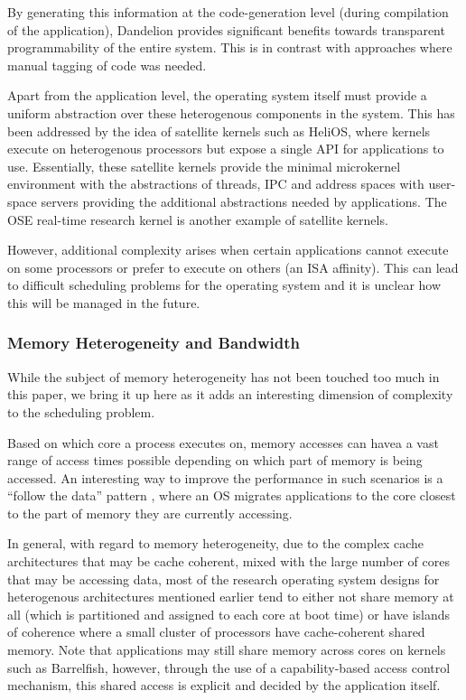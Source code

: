 By generating this information at the code-generation level (\ie during compilation of the application), Dandelion provides significant benefits towards transparent programmability of the entire system. This is in contrast with approaches where manual tagging of code was needed.


Apart from the application level, the operating system itself must provide a uniform abstraction over these heterogenous components in the system. This has been addressed by the idea of satellite kernels such as HeliOS, where kernels execute on heterogenous processors but expose a single API for applications to use. Essentially, these satellite kernels provide the minimal microkernel environment with the abstractions of threads, IPC and address spaces with user-space servers providing the additional abstractions needed by applications. The OSE real-time research kernel is another example of satellite kernels.

However, additional complexity arises when certain applications cannot execute on some processors or prefer to execute on others (\ie an ISA affinity). This can lead to difficult scheduling problems for the operating system and it is unclear how this will be managed in the future.

\subsubsection{Memory Heterogeneity and Bandwidth}
While the subject of memory heterogeneity has not been touched too much in this paper, we bring it up here as it adds an interesting dimension of complexity to the scheduling problem.

Based on which core a process executes on, memory accesses can havea a vast range of access times possible depending on which part of memory is being accessed. An interesting way to improve the performance in such scenarios is a ``follow the data'' pattern \cite{Follow-Pattern}, where an OS migrates applications to the core closest to the part of memory they are currently accessing.

In general, with regard to memory heterogeneity, due to the complex cache architectures that may be cache coherent, mixed with the large number of cores that may be accessing data, most of the research operating system designs for heterogenous architectures mentioned earlier tend to either not share memory at all (which is partitioned and assigned to each core at boot time) or have islands of coherence where a small cluster of processors have cache-coherent shared memory. Note that applications may still share memory across cores on kernels such as Barrelfish, however, through the use of a capability-based access control mechanism, this shared access is explicit and decided by the application itself.

